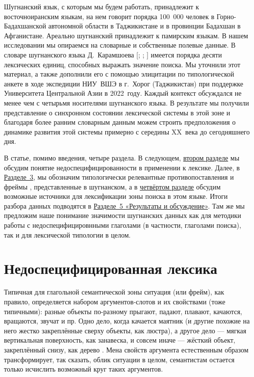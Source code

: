 Шугнанский язык, с которым мы будем работать, принадлежит к восточноиранским языкам, на нем говорит порядка 100~000 человек в Горно-Бадахшанской автономной области в Таджикистане и в провинции Бадахшан в Афганистане. Ареально шугнанский принадлежит к памирским языкам. В нашем исследовании мы опираемся на словарные и собственные полевые данные. В словаре шугнанского языка Д.~Карамшоева [\cite*{karamshoev1988}; \cite*{karamshoev1991}; \cite*{karamshoev1999}] имеется порядка десяти лексических единиц, способных выражать значение поиска. Мы уточнили этот материал, а также дополнили его с помощью элицитации по типологической анкете в ходе экспедиции НИУ~ВШЭ в г.~Хорог (Таджикистан) при поддержке Университета Центральной Азии в 2022~году. Каждый контекст обсуждался не менее чем с четырьмя носителями шугнанского языка. В результате мы получили представление о синхронном состоянии лексической системы в этой зоне и благодаря более ранним словарным данным можем строить предположения о динамике развития этой системы примерно с середины XX~века до сегодняшнего дня.

В статье, помимо введения, четыре раздела. В следующем, \hyperref[search-unspec]{втором разделе} мы обсудим понятие недоспецифицированности в применении к лексике. Далее, в \hyperref[search-frames]{Разделе~3}, мы обозначим типологически релевантные противопоставления и фреймы , представленные в шугнанском, а в \hyperref[search-sources]{четвёртом разделе} обсудим возможные источники для лексификации зоны поиска в этом языке. Итоги разбора данных подводятся в \hyperref[search-results]{Разделе~5 «Результаты и обсуждение»}. Там же мы предложим наше понимание значимости шугнанских данных как для методики работы с недоспецифицировнными глаголами (в частности, глаголами поиска), так и для лексической типологии в целом.

\section{Недоспецифицированная лексика} \label{search-unspec}

Типичная для глагольной семантической зоны ситуация (или фрейм), как правило, определяется набором аргументов-слотов и их свойствами (тоже типичными): разные объекты по-разному прыгают, падают, плавают, качаются, вращаются, звучат и пр. Одно дело, когда качается маятник (и другие похожие на него жестко закреплённые сверху объекты, как люстра), а другое дело — мягкая вертикальная поверхность, как занавеска, и совсем иначе — жёсткий объект, закреплённый снизу, как дерево \parencites{rakhilina_prokofieva2005}{shapiro2015}. Мена свойств аргумента естественным образом трансформирует, так сказать, облик ситуации в целом, семантистам остается только исчислить возможный круг таких аргументов.

